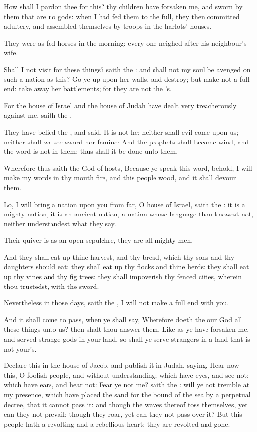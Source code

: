 \verse How shall I pardon thee for this? thy children have forsaken me, and sworn by them that are no gods: when I had fed them to the full, they then committed adultery, and assembled themselves by troops in the harlots' houses.

\verse They were as fed horses in the morning: every one neighed after his neighbour's wife.

\verse Shall I not visit for these things? saith the \LORD: and shall not my soul be avenged on such a nation as this?  \verse Go ye up upon her walls, and destroy; but make not a full end: take away her battlements; for they are not the \LORD's.

\verse For the house of Israel and the house of Judah have dealt very treacherously against me, saith the \LORD.

\verse They have belied the \LORD, and said, It is not he; neither shall evil come upon us; neither shall we see sword nor famine: \verse And the prophets shall become wind, and the word is not in them: thus shall it be done unto them.

\verse Wherefore thus saith the \LORD God of hosts, Because ye speak this word, behold, I will make my words in thy mouth fire, and this people wood, and it shall devour them.

\verse Lo, I will bring a nation upon you from far, O house of Israel, saith the \LORD: it is a mighty nation, it is an ancient nation, a nation whose language thou knowest not, neither understandest what they say.

\verse Their quiver is as an open sepulchre, they are all mighty men.

\verse And they shall eat up thine harvest, and thy bread, which thy sons and thy daughters should eat: they shall eat up thy flocks and thine herds: they shall eat up thy vines and thy fig trees: they shall impoverish thy fenced cities, wherein thou trustedst, with the sword.

\verse Nevertheless in those days, saith the \LORD, I will not make a full end with you.

\verse And it shall come to pass, when ye shall say, Wherefore doeth the \LORD our God all these things unto us? then shalt thou answer them, Like as ye have forsaken me, and served strange gods in your land, so shall ye serve strangers in a land that is not your's.

\verse Declare this in the house of Jacob, and publish it in Judah, saying, \verse Hear now this, O foolish people, and without understanding; which have eyes, and see not; which have ears, and hear not: \verse Fear ye not me? saith the \LORD: will ye not tremble at my presence, which have placed the sand for the bound of the sea by a perpetual decree, that it cannot pass it: and though the waves thereof toss themselves, yet can they not prevail; though they roar, yet can they not pass over it?  \verse But this people hath a revolting and a rebellious heart; they are revolted and gone.

